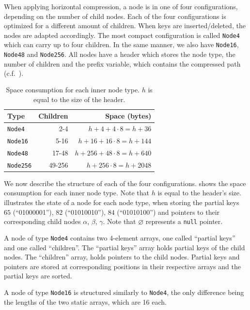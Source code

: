 \documentclass[abstracton,12pt]{scrartcl}
\theoremstyle{definition}
\begin{document}
When applying horizontal compression, a node is in one of four configurations, 
depending on the number of child nodes. Each of the four configurations is 
optimized for a different amount of children.
When keys are inserted/deleted, the nodes are adapted accordingly.
The most compact configuration 
is called \texttt{Node4} which can carry up to four children. 
In the same manner, we also have \texttt{Node16}, \texttt{Node48} 
and \texttt{Node256}. All nodes have a header which stores the node type,
the number of children and the prefix variable, which contains the compressed
path (c.f.\ ).

\begin{table}[h]
  \centering
  \begin{tabular}{ l|r|r } 
    Type & Children & Space (bytes) \\
    \hline
    \texttt{Node4} & 2-4 & $h + 4 + 4 \cdot 8 = h + 36$ \\ 
    \texttt{Node16} & 5-16 & $h + 16 + 16 \cdot 8 = h + 144$ \\ 
    \texttt{Node48} & 17-48 & $h + 256 + 48 \cdot 8 = h + 640$ \\ 
    \texttt{Node256} & 49-256 & $h + 256 \cdot 8 = h + 2048$ 
  \end{tabular}
  \caption{Space consumption for each inner node type. $h$ is equal to
    the size of the header.}
  \label{tbl:node-sizes}
\end{table}

We now describe the structure of each of the four configurations.
 shows the space consumption for each inner node type.
Note that $h$ is equal to the header's size.
 illustrates the state of a node
for each node type, when storing the partial keys $65$ (``01000001''), 
$82$ (``01010010''), $84$ (``01010100'') and pointers to their corresponding 
child nodes $\alpha$, $\beta$, $\gamma$. Note that $\varnothing$ represents 
a \texttt{null} pointer.

A node of type \texttt{Node4} contains two 4-element arrays, one called
``partial keys'' and one called ``children''.
The ``partial keys'' array holds partial keys of the child nodes. 
The ``children'' array, holds pointers to the child nodes.
Partial keys and pointers are stored at corresponding positions in their
respective arrays and the partial keys are sorted.

A node of type \texttt{Node16} is structured similarly
to \texttt{Node4}, the only difference being the lengths of the two static 
arrays, which are 16 each.
\end{document}
